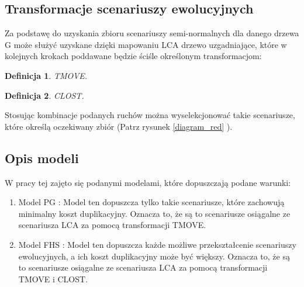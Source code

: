 \documentclass[licencjacka]{pracamgr}
\newtheorem{defi}{Definicja}[section]
\begin{document}
\subsection{Transformacje scenariuszy ewolucyjnych}

Za podstawę do uzyskania zbioru scenariuszy semi-normalnych dla danego drzewa G może służyć uzyskane dzięki mapowaniu LCA drzewo uzgadniające, które w kolejnych krokach poddawane będzie ściśle określonym transformacjom: 

\begin{defi}\label{TMOVE}
  TMOVE.
\end{defi}

\begin{defi}\label{CLOST}
  CLOST.
\end{defi}

Stosując kombinacje podanych ruchów można wyselekcjonować takie scenariusze, które określą oczekiwany zbiór (Patrz rysunek \ref{diagram_red} ).

\subsection{Opis modeli}

W pracy tej zajęto się podanymi modelami, które dopuszczają podane warunki:
\begin{enumerate}
\item Model PG \cite{PG}: Model ten dopuszcza tylko takie scenariusze, które zachowują minimalny koszt duplikacyjny. Oznacza to, że są to scenariusze osiągalne ze scenariusza LCA za pomocą transformacji TMOVE.
\item Model FHS \cite{FHS}: Model ten dopuszcza każde możliwe przekształcenie scenariuszy ewolucyjnych, a ich koszt duplikacyjny może być większy. Oznacza to, że są to scenariusze osiągalne ze scenariusza LCA za pomocą transformacji TMOVE i CLOST.
\end{enumerate}
\end{document}
